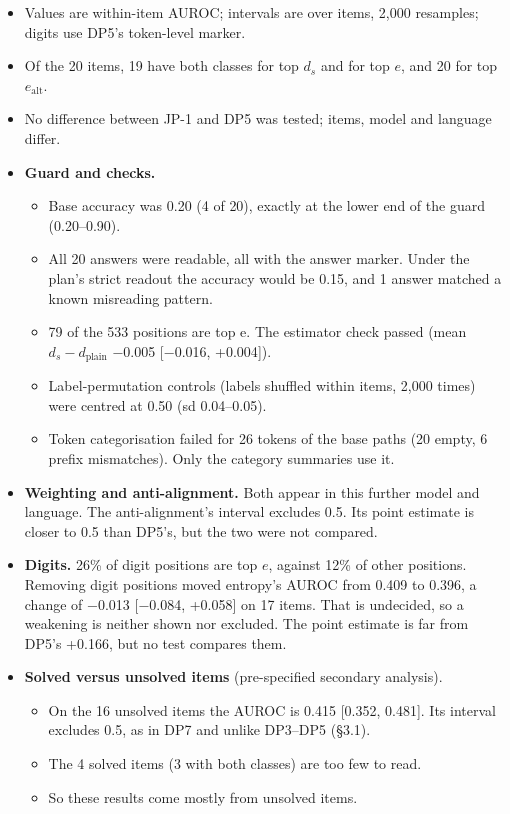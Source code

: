 \documentclass[
  10pt,
  a4paper,
]{article}
\providecommand{\tightlist}{%
  \setlength{\itemsep}{0pt}\setlength{\parskip}{0pt}}
\begin{document}
\begin{itemize}
\item
  Values are within-item AUROC; intervals are over items, 2,000 resamples; digits use DP5's token-level marker.
\item
  Of the 20 items, 19 have both classes for top \(d_{s}\) and for top \(e\), and 20 for top \(e_{\mathrm{alt}}\).
\item
  No difference between JP-1 and DP5 was tested; items, model and language differ.
\item
  \textbf{Guard and checks.}

  \begin{itemize}
  \tightlist
  \item
    Base accuracy was 0.20 (4 of 20), exactly at the lower end of the guard (0.20--0.90).
  \item
    All 20 answers were readable, all with the answer marker. Under the plan's strict readout the accuracy would be 0.15, and 1 answer matched a known misreading pattern.
  \item
    79 of the 533 positions are top e. The estimator check passed (mean \(d_{s} - d_{\mathrm{plain}}\) −0.005 {[}−0.016, +0.004{]}).
  \item
    Label-permutation controls (labels shuffled within items, 2,000 times) were centred at 0.50 (sd 0.04--0.05).
  \item
    Token categorisation failed for 26 tokens of the base paths (20 empty, 6 prefix mismatches). Only the category summaries use it.
  \end{itemize}
\item
  \textbf{Weighting and anti-alignment.} Both appear in this further model and language. The anti-alignment's interval excludes 0.5. Its point estimate is closer to 0.5 than DP5's, but the two were
  not compared.
\item
  \textbf{Digits.} 26\% of digit positions are top \(e\), against 12\% of other positions. Removing digit positions moved entropy's AUROC from 0.409 to 0.396, a change of −0.013 {[}−0.084, +0.058{]}
  on 17 items. That is undecided, so a weakening is neither shown nor excluded. The point estimate is far from DP5's +0.166, but no test compares them.
\item
  \textbf{Solved versus unsolved items} (pre-specified secondary analysis).

  \begin{itemize}
  \tightlist
  \item
    On the 16 unsolved items the AUROC is 0.415 {[}0.352, 0.481{]}. Its interval excludes 0.5, as in DP7 and unlike DP3--DP5 (§3.1).
  \item
    The 4 solved items (3 with both classes) are too few to read.
  \item
    So these results come mostly from unsolved items.
  \end{itemize}
\end{itemize}
\end{document}
